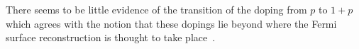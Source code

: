 There seems to be little evidence of the transition of the doping from $p$ to $1+p$ which agrees with the notion that these dopings lie beyond where the Fermi surface reconstruction is thought to take place~\cite{LeBoeuf2007}. 




